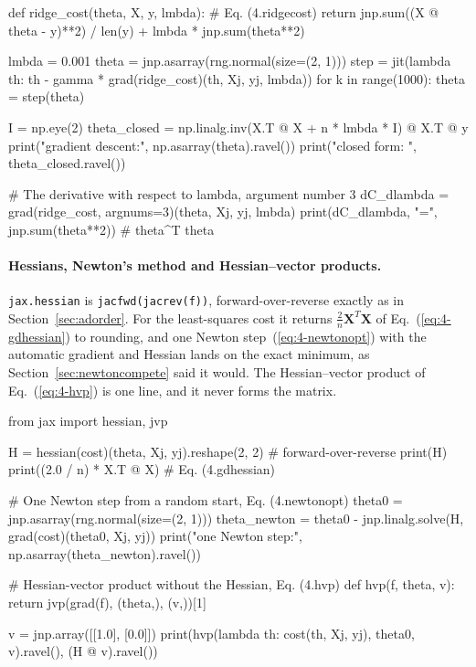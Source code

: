 \begin{Python}{}
def ridge_cost(theta, X, y, lmbda):        # Eq. (4.ridgecost)
    return jnp.sum((X @ theta - y)**2) / len(y) + lmbda * jnp.sum(theta**2)

lmbda = 0.001
theta = jnp.asarray(rng.normal(size=(2, 1)))
step = jit(lambda th: th - gamma * grad(ridge_cost)(th, Xj, yj, lmbda))
for k in range(1000):
    theta = step(theta)

I = np.eye(2)
theta_closed = np.linalg.inv(X.T @ X + n * lmbda * I) @ X.T @ y
print("gradient descent:", np.asarray(theta).ravel())
print("closed form:     ", theta_closed.ravel())

# The derivative with respect to lambda, argument number 3
dC_dlambda = grad(ridge_cost, argnums=3)(theta, Xj, yj, lmbda)
print(dC_dlambda, "=", jnp.sum(theta**2))    # theta^T theta
\end{Python}

\paragraph{Hessians, Newton's method and Hessian--vector products.}
\texttt{jax.hessian} is \texttt{jacfwd(jacrev(f))}, forward-over-reverse
exactly as in Section~\ref{sec:adorder}.  For the least-squares cost it
returns $\frac{2}{n}\bm{X}^{T}\bm{X}$ of Eq.~(\ref{eq:4-gdhessian}) to
rounding, and one Newton step~(\ref{eq:4-newtonopt}) with the automatic
gradient and Hessian lands on the exact minimum, as
Section~\ref{sec:newtoncompete} said it would.  The Hessian--vector product
of Eq.~(\ref{eq:4-hvp}) is one line, and it never forms the matrix.

\begin{Python}{}
from jax import hessian, jvp

H = hessian(cost)(theta, Xj, yj).reshape(2, 2)     # forward-over-reverse
print(H)
print((2.0 / n) * X.T @ X)                         # Eq. (4.gdhessian)

# One Newton step from a random start, Eq. (4.newtonopt)
theta0 = jnp.asarray(rng.normal(size=(2, 1)))
theta_newton = theta0 - jnp.linalg.solve(H, grad(cost)(theta0, Xj, yj))
print("one Newton step:", np.asarray(theta_newton).ravel())

# Hessian-vector product without the Hessian, Eq. (4.hvp)
def hvp(f, theta, v):
    return jvp(grad(f), (theta,), (v,))[1]

v = jnp.array([[1.0], [0.0]])
print(hvp(lambda th: cost(th, Xj, yj), theta0, v).ravel(), (H @ v).ravel())
\end{Python}

